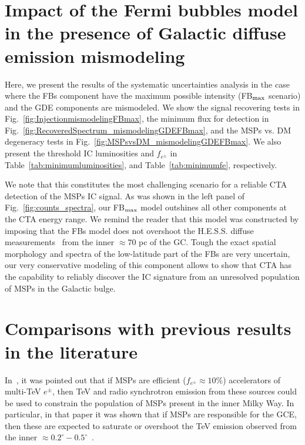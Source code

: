 \documentclass[doublespace,nopageskip]{VTthesis} %
\begin{document}
\begin{appendices}
\section{Impact of the Fermi bubbles model in the presence of Galactic diffuse emission mismodeling}
\label{appdx:FBmaxandmismodeling}

Here, we present the results of the systematic uncertainties analysis in the case where the FBs component have the maximum possible intensity (FB$_{\rm max}$ scenario) and the GDE components are mismodeled. We show the signal recovering tests in Fig.~\ref{fig:InjectionmismodelingFBmax}, the minimum flux for detection in Fig.~\ref{fig:RecoveredSpectrum_mismodelingGDEFBmax}, and the MSPs vs. DM degeneracy tests in Fig.~\ref{fig:MSPsvsDM_mismodelingGDEFBmax}. We also present the threshold IC luminosities and $f_{e^\pm}$ in Table~\ref{tab:minimumluminosities}, and Table~\ref{tab:minimumfe}, respectively. 

 We note that this constitutes the most challenging scenario for a reliable CTA detection of the MSPs IC signal. As was shown in the left panel of Fig.~\ref{fig:counts_spectra}, our FB$_{\rm max}$ model outshines all other components at the CTA energy range. We remind the reader that this model was constructed by imposing that the FBs model does not overshoot the H.E.S.S. diffuse  measurements~\citep{Abramowski:2016mir} from the inner $\approx 70$ pc of the GC. Tough the exact spatial morphology and spectra of the low-latitude part of the FBs are very uncertain, our very conservative modeling of this component allows to show that CTA has the capability to reliably discover the IC signature from an unresolved population of MSPs in the Galactic bulge.    
 
 \section{Comparisons with previous results in the literature}
 
 In~\citet{Hooper:2018fih}, it was pointed out that if MSPs are efficient ($f_{e^\pm}\approx 10\%$) accelerators of multi-TeV $e^\pm$, then TeV and radio
synchrotron emission from these sources could be used to constrain the population of MSPs present in the inner Milky Way. In particular, in that paper it was shown that if MSPs are responsible for the GCE, then these are expected to saturate or overshoot the TeV emission observed from the inner $\approx 0.2^\circ-0.5^\circ$~\citep{Abramowski:2016mir}. 
 

\end{appendices}
\end{document}
